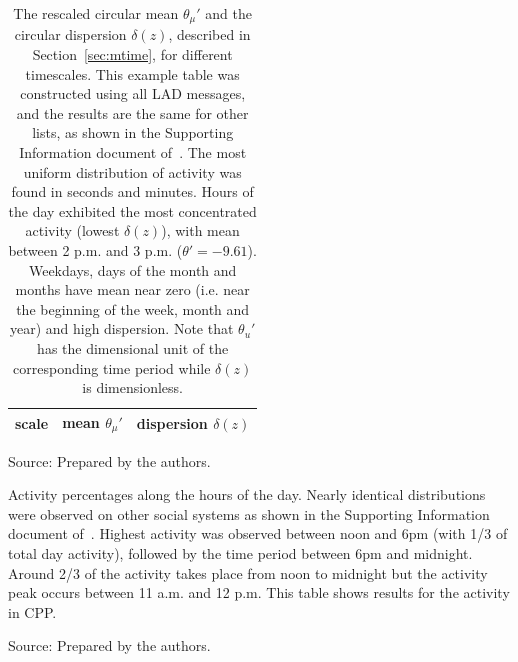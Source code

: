 \begin{table}
	\caption{The rescaled circular mean $\theta_\mu'$ and the circular dispersion $\delta(z)$, described in Section~\ref{sec:mtime}, for different timescales. This example table was constructed using all LAD messages, and the results are the same for other lists, as shown in the Supporting Information document of~\cite{stab}. The most uniform distribution of activity was found in seconds and minutes. 	Hours of the day exhibited the most concentrated activity (lowest $\delta(z)$), with mean between 2 p.m. and 3 p.m. ($\theta'=-9.61$). Weekdays, days of the month and months have mean near zero (i.e. near the beginning of the week, month and year) and high dispersion. Note that $\theta_u'$ has the dimensional unit of the corresponding time period while $\delta(z)$ is dimensionless.}
	\begin{center}
	\begin{tabular}{ |l|| c|c| }
	\hline
	scale & mean $\theta_\mu'$ & dispersion $\delta(z)$  \\ \hline
	
	\end{tabular}
	\begin{flushleft}
			Source: Prepared by the authors.\
			\end{flushleft}
			\end{center}
			\label{tab:circ}
			\end{table}

			\begin{table}
				\caption{Activity percentages along the hours of the day. Nearly identical distributions were observed on other social systems as shown in the Supporting Information document of~\cite{stab}.
				Highest activity was observed between noon and 6pm (with 1/3 of total day activity), followed by the time period between 6pm and midnight.
				Around 2/3 of the activity takes place from noon to midnight
				but the activity peak occurs between 11 a.m. and 12 p.m.
				This table shows results for the activity in CPP.}
				\footnotesize
				
				\label{tab:hin}
				\begin{flushleft}
						Source: Prepared by the authors.\
						\end{flushleft}
						\end{table}


